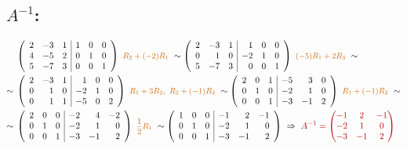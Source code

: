 \documentclass[10pt,a4paper]{article}
\newcommand{\pozn}[1]{{\color{red!75!black}#1}}
\newcommand{\aug}[1]{\left(\begin{array}{rrr|rrr}#1\end{array}\right)}
\newcommand{\krok}[1]{\text{\small\color{orange!80!black}#1}}
\begin{document}
\subsection*{\pozn{$A^{-1}$:}}
\begin{align*}
&\aug{2 & -3 & 1 & 1 & 0 & 0\\ 4 & -5 & 2 & 0 & 1 & 0\\ 5 & -7 & 3 & 0 & 0 & 1}
\ \krok{$R_2+(-2)R_1$}\ \sim
\aug{2 & -3 & 1 & 1 & 0 & 0\\ 0 & 1 & 0 & -2 & 1 & 0\\ 5 & -7 & 3 & 0 & 0 & 1}
\ \krok{$(-5)R_1+2R_3$}\ \sim\\
\sim{}&\aug{2 & -3 & 1 & 1 & 0 & 0\\ 0 & 1 & 0 & -2 & 1 & 0\\ 0 & 1 & 1 & -5 & 0 & 2}
\ \krok{$R_1+3R_2,\ R_3+(-1)R_2$}\ \sim
\aug{2 & 0 & 1 & -5 & 3 & 0\\ 0 & 1 & 0 & -2 & 1 & 0\\ 0 & 0 & 1 & -3 & -1 & 2}
\ \krok{$R_1+(-1)R_3$}\ \sim\\
\sim{}&\aug{2 & 0 & 0 & -2 & 4 & -2\\ 0 & 1 & 0 & -2 & 1 & 0\\ 0 & 0 & 1 & -3 & -1 & 2}
\ \krok{$\frac12R_1$}\ \sim
\left(\begin{array}{rrr|rrr} 1 & 0 & 0 & -1 & 2 & -1\\ 0 & 1 & 0 & -2 & 1 & 0\\ 0 & 0 & 1 & -3 & -1 & 2 \end{array}\right)
\ \Rightarrow\ \pozn{A^{-1}=\begin{pmatrix} -1 & 2 & -1\\ -2 & 1 & 0\\ -3 & -1 & 2 \end{pmatrix}}
\end{align*}
\end{document}
